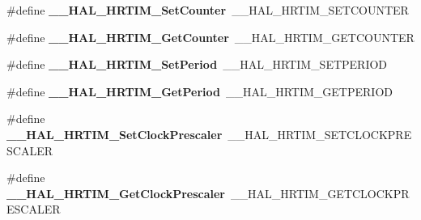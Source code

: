 \begin{DoxyCompactItemize}
\item 
\hypertarget{group___h_a_l___h_r_t_i_m___aliased___macros_gaa11c36c62453d27a8dd6db62917fb463}{\#define {\bfseries \-\_\-\-\_\-\-H\-A\-L\-\_\-\-H\-R\-T\-I\-M\-\_\-\-Set\-Counter}~\-\_\-\-\_\-\-H\-A\-L\-\_\-\-H\-R\-T\-I\-M\-\_\-\-S\-E\-T\-C\-O\-U\-N\-T\-E\-R}\label{group___h_a_l___h_r_t_i_m___aliased___macros_gaa11c36c62453d27a8dd6db62917fb463}

\item 
\hypertarget{group___h_a_l___h_r_t_i_m___aliased___macros_ga884c22338dec011ab9e4055589c6cd01}{\#define {\bfseries \-\_\-\-\_\-\-H\-A\-L\-\_\-\-H\-R\-T\-I\-M\-\_\-\-Get\-Counter}~\-\_\-\-\_\-\-H\-A\-L\-\_\-\-H\-R\-T\-I\-M\-\_\-\-G\-E\-T\-C\-O\-U\-N\-T\-E\-R}\label{group___h_a_l___h_r_t_i_m___aliased___macros_ga884c22338dec011ab9e4055589c6cd01}

\item 
\hypertarget{group___h_a_l___h_r_t_i_m___aliased___macros_ga3e6ec773e1fd492d3cc4e9ff84054675}{\#define {\bfseries \-\_\-\-\_\-\-H\-A\-L\-\_\-\-H\-R\-T\-I\-M\-\_\-\-Set\-Period}~\-\_\-\-\_\-\-H\-A\-L\-\_\-\-H\-R\-T\-I\-M\-\_\-\-S\-E\-T\-P\-E\-R\-I\-O\-D}\label{group___h_a_l___h_r_t_i_m___aliased___macros_ga3e6ec773e1fd492d3cc4e9ff84054675}

\item 
\hypertarget{group___h_a_l___h_r_t_i_m___aliased___macros_ga6ca57b361c0d23cb29ed29beddb189a4}{\#define {\bfseries \-\_\-\-\_\-\-H\-A\-L\-\_\-\-H\-R\-T\-I\-M\-\_\-\-Get\-Period}~\-\_\-\-\_\-\-H\-A\-L\-\_\-\-H\-R\-T\-I\-M\-\_\-\-G\-E\-T\-P\-E\-R\-I\-O\-D}\label{group___h_a_l___h_r_t_i_m___aliased___macros_ga6ca57b361c0d23cb29ed29beddb189a4}

\item 
\hypertarget{group___h_a_l___h_r_t_i_m___aliased___macros_gab5a9ad347b90b2128c7d4fe100758b7d}{\#define {\bfseries \-\_\-\-\_\-\-H\-A\-L\-\_\-\-H\-R\-T\-I\-M\-\_\-\-Set\-Clock\-Prescaler}~\-\_\-\-\_\-\-H\-A\-L\-\_\-\-H\-R\-T\-I\-M\-\_\-\-S\-E\-T\-C\-L\-O\-C\-K\-P\-R\-E\-S\-C\-A\-L\-E\-R}\label{group___h_a_l___h_r_t_i_m___aliased___macros_gab5a9ad347b90b2128c7d4fe100758b7d}

\item 
\hypertarget{group___h_a_l___h_r_t_i_m___aliased___macros_ga2647242e720056855c36153ef4c19d86}{\#define {\bfseries \-\_\-\-\_\-\-H\-A\-L\-\_\-\-H\-R\-T\-I\-M\-\_\-\-Get\-Clock\-Prescaler}~\-\_\-\-\_\-\-H\-A\-L\-\_\-\-H\-R\-T\-I\-M\-\_\-\-G\-E\-T\-C\-L\-O\-C\-K\-P\-R\-E\-S\-C\-A\-L\-E\-R}\label{group___h_a_l___h_r_t_i_m___aliased___macros_ga2647242e720056855c36153ef4c19d86}


\end{DoxyCompactItemize}
